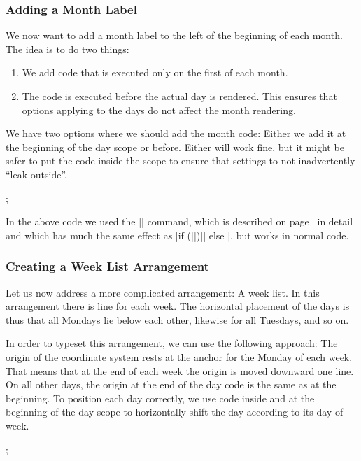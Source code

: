 \subsubsection{Adding a Month Label}

We now want to add a month label to the left of the beginning of each month.
The idea is to do two things:
%
\begin{enumerate}
    \item We add code that is executed only on the first of each month.
    \item The code is executed before the actual day is rendered. This ensures
        that options applying to the days do not affect the month rendering.
\end{enumerate}
%
We have two options where we should add the month code: Either we add it at the
beginning of the day scope or before. Either will work fine, but it might be
safer to put the code inside the scope to ensure that settings to not
inadvertently ``leak outside''.
%
\begin{codeexample}[preamble={\usetikzlibrary{calendar}}]
\tikz
  \calendar
    [dates=2000-01-01 to 2000-01-08,
     execute after day scope={\pgftransformyshift{-1em}},
     execute at begin day scope=
       {\ifdate{day of month=1}{\tikzmonthcode}{}},
     every month/.append style={anchor=base east,xshift=-2em}];
\end{codeexample}

In the above code we used the |\ifdate| command, which is described on page~\pageref{ifdate} in
detail and which has much the same effect as
|if (||)|| else |, but works in
normal code.


\subsubsection{Creating a Week List Arrangement}

Let us now address a more complicated arrangement: A week list. In this
arrangement there is line for each week. The horizontal placement of the days
is thus that all Mondays lie below each other, likewise for all Tuesdays, and
so on.

In order to typeset this arrangement, we can use the following approach: The
origin of the coordinate system rests at the anchor for the Monday of each
week. That means that at the end of each week the origin is moved downward one
line. On all other days, the origin at the end of the day code is the same as
at the beginning. To position each day correctly, we use code inside and at the
beginning of the day scope to horizontally shift the day according to its day
of week.
%
\begin{codeexample}[preamble={\usetikzlibrary{calendar}}]
\tikz
  \calendar
    [dates=2000-01-01 to 2000-01-20,
     execute at begin day scope=
       {\pgftransformxshift{\pgfcalendarcurrentweekday em}},
     execute after day scope=
       {\ifdate{Sunday}{\pgftransformyshift{-1em}}{}}];
\end{codeexample}


